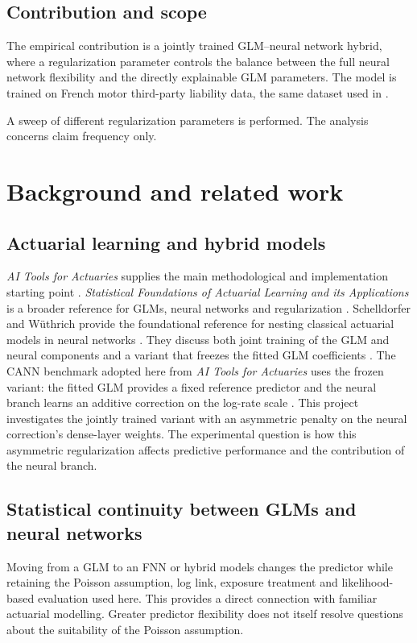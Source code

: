 \documentclass[a4paper]{article}
\begin{document}
\subsection{Contribution and scope}
The empirical contribution is a jointly trained GLM--neural network hybrid, where a regularization parameter controls the balance between the full neural network flexibility and the directly explainable GLM parameters.
The model is trained on French motor third-party liability data, the same dataset used in \cite{resources}.

A sweep of different regularization parameters is performed.
The analysis concerns claim frequency only.

\section{Background and related work}
\subsection{Actuarial learning and hybrid models}
\emph{AI Tools for Actuaries} supplies the main methodological and
implementation starting point \cite{aitools,resources}.
\emph{Statistical Foundations of Actuarial Learning and its Applications}
is a broader reference for GLMs, neural networks and regularization
\cite{foundations}.
Schelldorfer and W\"uthrich provide the foundational reference for nesting
classical actuarial models in neural networks \cite{nesting}.
They discuss both joint training of the GLM and neural components and a
variant that freezes the fitted GLM coefficients \cite{nesting}.
The CANN benchmark adopted here from \emph{AI Tools for Actuaries} uses
the frozen variant: the fitted GLM provides a fixed reference predictor
and the neural branch learns an additive correction on the log-rate scale
\cite{aitools,resources}.
This project investigates the jointly trained variant with an asymmetric
penalty on the neural correction's dense-layer weights.
The experimental question is how this asymmetric regularization affects
predictive performance and the contribution of the neural branch.

\subsection{Statistical continuity between GLMs and neural networks}
Moving from a GLM to an FNN or hybrid models changes the predictor while retaining the
Poisson assumption, log link, exposure treatment and likelihood-based
evaluation used here.
This provides a direct connection with familiar actuarial modelling.
Greater predictor flexibility does not itself resolve questions about
the suitability of the Poisson assumption.
\end{document}
